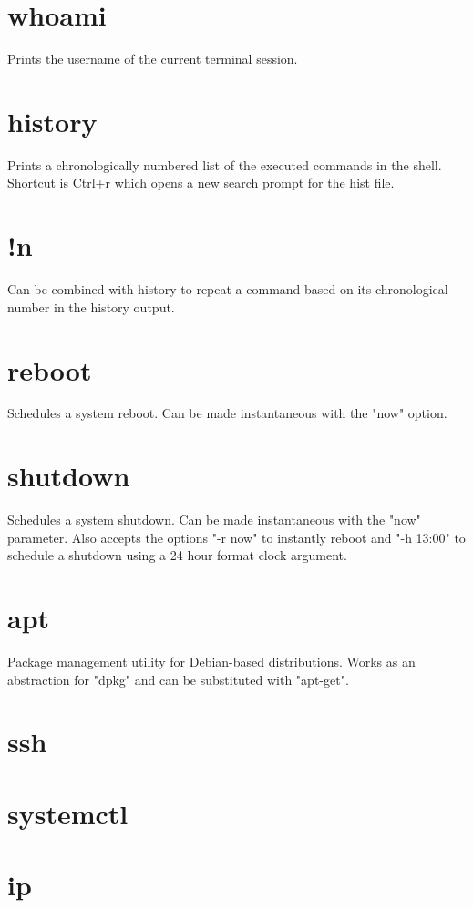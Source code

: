 \documentclass[]{article}
\begin{document}
\section{whoami}

Prints the username of the current terminal session.

\section{history}

Prints a chronologically numbered list of the executed commands in the shell. Shortcut is Ctrl+r which opens a new search prompt for the hist file.

\section{!n}

Can be combined with history to repeat a command based on its chronological number in the history output.

\section{reboot}

Schedules a system reboot. Can be made instantaneous with the "now" option.

\section{shutdown}

Schedules a system shutdown. Can be made instantaneous with the "now" parameter. Also accepts the options "-r now" to instantly reboot and "-h 13:00" to schedule a shutdown using a 24 hour format clock argument.

\section{apt}

Package management utility for Debian-based distributions. Works as an abstraction for "dpkg" and can be substituted with "apt-get".

\section{ssh}

\section{systemctl}

\section{ip}
 
\end{document}
